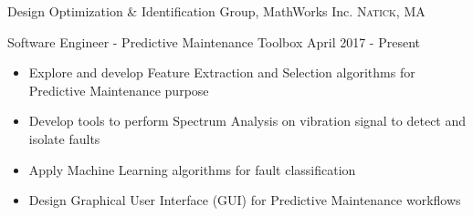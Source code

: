 \documentclass[10pt,a4paper]{article}
\begin{document}










\spacedhrule{0em}{-0.8em}


  \headedsection
{Design Optimization \& Identification Group, MathWorks Inc.}
{\textsc{Natick, MA}}
{
  \headedsubsection
  {Software Engineer - Predictive Maintenance Toolbox}
  {April 2017 - Present}
  {
    \begin{itemize}
    \item Explore and develop Feature Extraction and Selection algorithms for Predictive Maintenance purpose
    \item Develop tools to perform Spectrum Analysis on vibration signal to detect and isolate faults
    \item Apply Machine Learning algorithms for fault classification
    \item Design Graphical User Interface (GUI) for Predictive Maintenance workflows
    \end{itemize}
  }
}
\end{document}

